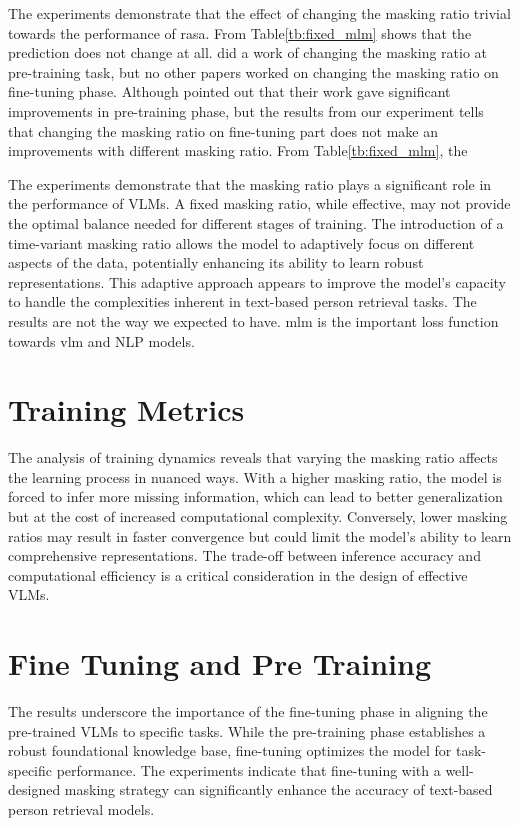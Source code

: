 The experiments demonstrate that the effect of changing the masking ratio trivial towards the performance of \acrshort{rasa}. From Table\ref{tb:fixed_mlm} shows that the prediction does not change at all. \cite{yang2023learningbettermaskingbetter} did a work of changing the masking ratio at pre-training task, but no other papers worked on changing the masking ratio on fine-tuning phase. 
Although \cite{yang2023learningbettermaskingbetter} pointed out that their work gave significant improvements in pre-training phase, but the results from our experiment tells that changing the masking ratio on fine-tuning part does not make an improvements with different masking ratio.
From Table\ref{tb:fixed_mlm}, the 

The experiments demonstrate that the masking ratio plays a significant role in the performance of VLMs. A fixed masking ratio, while effective, may not provide the optimal balance needed for different stages of training. The introduction of a time-variant masking ratio allows the model to adaptively focus on different aspects of the data, potentially enhancing its ability to learn robust representations. This adaptive approach appears to improve the model's capacity to handle the complexities inherent in text-based person retrieval tasks.
The results are not the way we expected to have. \acrshort{mlm} is the important loss function towards \acrshort{vlm} and NLP models. 


\section{Training Metrics}

The analysis of training dynamics reveals that varying the masking ratio affects the learning process in nuanced ways. With a higher masking ratio, the model is forced to infer more missing information, which can lead to better generalization but at the cost of increased computational complexity. Conversely, lower masking ratios may result in faster convergence but could limit the model's ability to learn comprehensive representations. The trade-off between inference accuracy and computational efficiency is a critical consideration in the design of effective VLMs.

\section{Fine Tuning and Pre Training}

The results underscore the importance of the fine-tuning phase in aligning the pre-trained VLMs to specific tasks. While the pre-training phase establishes a robust foundational knowledge base, fine-tuning optimizes the model for task-specific performance. The experiments indicate that fine-tuning with a well-designed masking strategy can significantly enhance the accuracy of text-based person retrieval models.


